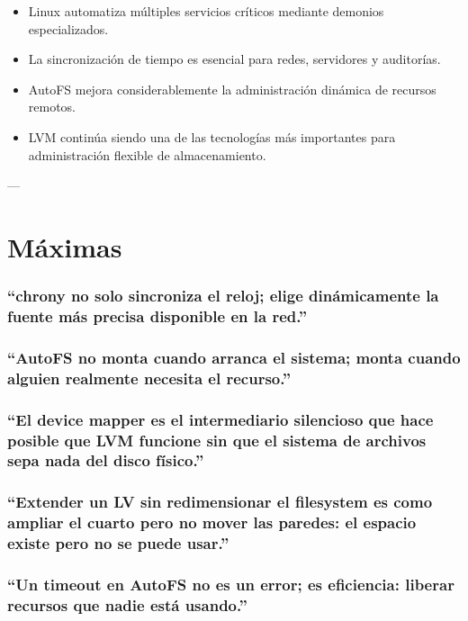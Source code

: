 \documentclass[11pt, letterpaper]{article}
\begin{document}
\begin{itemize}
\item Linux automatiza múltiples servicios críticos mediante demonios especializados.
\item La sincronización de tiempo es esencial para redes, servidores y auditorías.
\item AutoFS mejora considerablemente la administración dinámica de recursos remotos.
\item LVM continúa siendo una de las tecnologías más importantes para administración flexible de almacenamiento.
\end{itemize}

---
\section{Máximas}
\label{sec:org06b6453}

\subsubsection{“chrony no solo sincroniza el reloj; elige dinámicamente la fuente más precisa disponible en la red.”}
\label{sec:orgc3ec53e}

\subsubsection{“AutoFS no monta cuando arranca el sistema; monta cuando alguien realmente necesita el recurso.”}
\label{sec:org81b5c70}

\subsubsection{“El device mapper es el intermediario silencioso que hace posible que LVM funcione sin que el sistema de archivos sepa nada del disco físico.”}
\label{sec:org1cc99ab}

\subsubsection{“Extender un LV sin redimensionar el filesystem es como ampliar el cuarto pero no mover las paredes: el espacio existe pero no se puede usar.”}
\label{sec:org47637f6}

\subsubsection{“Un timeout en AutoFS no es un error; es eficiencia: liberar recursos que nadie está usando.”}
\label{sec:org2440163}
\end{document}
